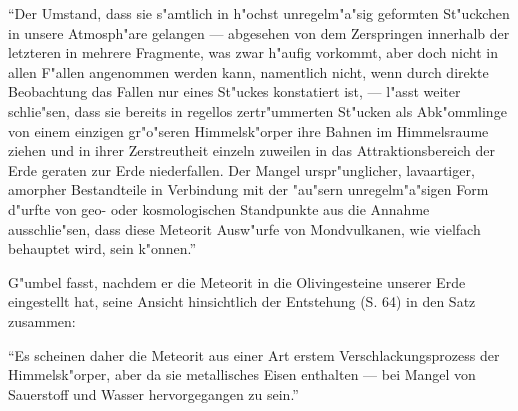 \documentclass[a4paper, 11pt, oneside]{article}
\begin{document}
"`Der Umstand, dass sie s"amtlich in h"ochst unregelm"a"sig geformten St"uckchen in unsere Atmosph"are gelangen --- abgesehen von dem Zerspringen innerhalb der letzteren in mehrere Fragmente, was zwar h"aufig vorkommt, aber doch nicht in allen F"allen angenommen werden kann, namentlich nicht, wenn durch direkte Beobachtung das Fallen nur eines St"uckes konstatiert ist, --- l"asst weiter schlie"sen, dass sie bereits in regellos zertr"ummerten St"ucken als Abk"ommlinge von einem einzigen gr"o"seren Himmelsk"orper ihre Bahnen im Himmelsraume ziehen und in ihrer Zerstreutheit einzeln zuweilen in das Attraktionsbereich der Erde geraten zur Erde niederfallen. Der Mangel urspr"unglicher, lavaartiger, amorpher Bestandteile in Verbindung mit der "au"sern unregelm"a"sigen Form d"urfte von geo- oder kosmologischen Standpunkte aus die Annahme ausschlie"sen, dass diese Meteorit Ausw"urfe von Mondvulkanen, wie vielfach behauptet wird, sein k"onnen."'

G"umbel fasst, nachdem er die Meteorit in die Olivingesteine unserer Erde eingestellt hat, seine Ansicht hinsichtlich der Entstehung (S. 64) in den Satz zusammen:

"`Es scheinen daher die Meteorit aus einer Art erstem Verschlackungsprozess der Himmelsk"orper, aber da sie metallisches Eisen enthalten --- bei Mangel von Sauerstoff und Wasser hervorgegangen zu sein."'
\end{document}
